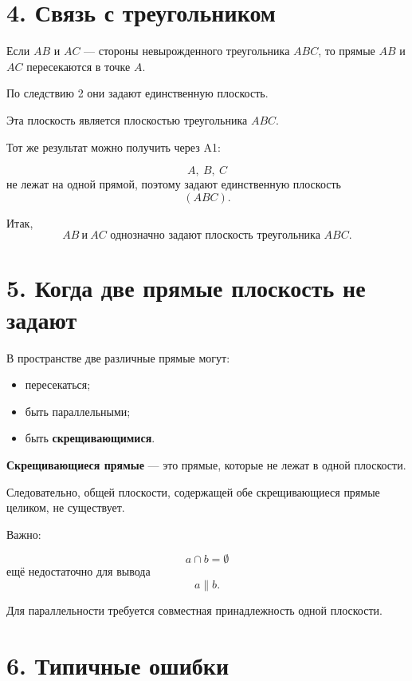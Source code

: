\documentclass[a4paper,12pt]{article}
\newcommand{\term}[1]{\textbf{\textcolor{darkaccent}{#1}}}
\begin{document}
\clearpage


\section*{4. Связь с треугольником}

Если $AB$ и $AC$ --- стороны невырожденного
треугольника $ABC$, то прямые $AB$ и $AC$
пересекаются в точке $A$.

По следствию 2 они задают единственную плоскость.

Эта плоскость является плоскостью треугольника $ABC$.

Тот же результат можно получить через A1:

\[
A,\ B,\ C
\]
не лежат на одной прямой, поэтому задают единственную
плоскость
\[
(ABC).
\]

Итак,
\[
\boxed{
AB\ \text{и}\ AC
\text{ однозначно задают плоскость треугольника }ABC
}.
\]


\section*{5. Когда две прямые плоскость не задают}

В пространстве две различные прямые могут:

\begin{itemize}
    \item пересекаться;
    \item быть параллельными;
    \item быть \term{скрещивающимися}.
\end{itemize}

\term{Скрещивающиеся прямые} ---
это прямые, которые не лежат в одной плоскости.

Следовательно, общей плоскости,
содержащей обе скрещивающиеся прямые целиком,
не существует.

Важно:

\[
a\cap b=\emptyset
\]
ещё недостаточно для вывода
\[
a\parallel b.
\]

Для параллельности требуется совместная принадлежность
одной плоскости.


\section*{6. Типичные ошибки}
\end{document}

